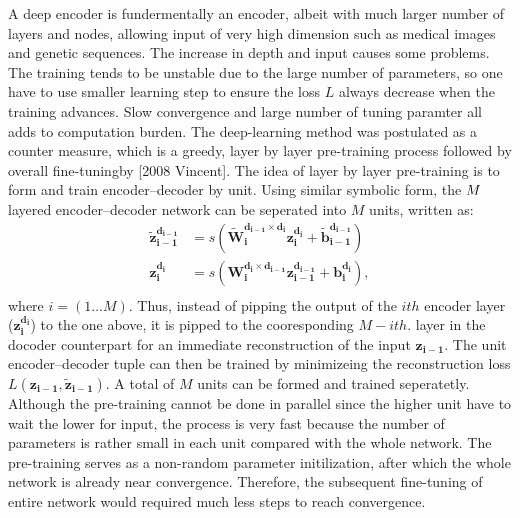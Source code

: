 \documentclass[twocolumn]{article}
\begin{document}
A deep encoder is fundermentally an encoder, albeit with much larger number of layers and nodes, allowing input of very high dimension such as medical images and genetic sequences. The increase in depth and input causes some problems. The training tends to be unstable due to the large number of parameters, so one have to use smaller learning step to ensure the loss $L$ always decrease when the training advances. Slow convergence and large number of tuning paramter all adds to computation burden. The deep-learning method was postulated as a counter measure, which is a greedy, layer by layer pre-training process followed by overall fine-tuningby [2008 Vincent]. The idea of layer by layer pre-training is to form and train encoder--decoder by unit. Using similar symbolic form, the $M \time 2$ layered encoder--decoder network can be seperated into $M$ units, written as:
\begin{equation} \label{eq:unit encoder-decoder}
\begin{split}
  \boldsymbol{\tilde{z}_{i-1}^{d_{i-1}}} &= s(\boldsymbol{\tilde{W}_{i  }^{d_{i-1} \times d_{i  }} z_{i  }^{d_{i  }}}+\boldsymbol{\tilde{b}_{i-1}^{d_{i-1}}}) \\
  \boldsymbol{z_{i  }^{d_{i  }}}         &= s(\boldsymbol{W_{i  }^{d_{i  } \times d_{i-1}} z_{i-1}^{d_{i-1}}}+\boldsymbol{b_{i  }^{d_{i  }}}), \\
\end{split}
\end{equation}
where $i=(1 \ldots M)$. Thus, instead of pipping the output of the $i th$ encoder layer ($\boldsymbol{z_{i  }^{d_{i  }}}$) to the one above, it is pipped to the cooresponding $M-i th.$ layer in the docoder counterpart for an immediate reconstruction of the input $\boldsymbol{z_{i-1}}$. The unit encoder--decoder tuple can then be trained by minimizeing the reconstruction loss $L(\boldsymbol{z_{i-1}},\boldsymbol{\tilde{z}_{i-1}})$. A total of $M$ units can be formed and trained seperatetly. Although the pre-training cannot be done in parallel since the higher unit have to wait the lower for input, the process is very fast because the number of parameters is rather small in each unit compared with the whole network. The pre-training serves as a non-random parameter initilization, after which the whole network is already near convergence. Therefore, the subsequent fine-tuning of entire network would required much less steps to reach convergence.
\end{document}
